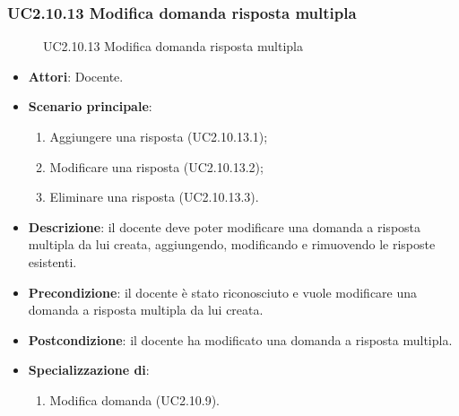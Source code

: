 \subsubsection{UC2.10.13 Modifica domanda risposta multipla}
\begin{figure}[H]
\centering
\noindent{}
\caption{UC2.10.13 Modifica domanda risposta multipla}
\end{figure}
\begin{itemize}
\item \textbf{Attori}: Docente.
\item \textbf{Scenario principale}:
\begin{enumerate}
\item Aggiungere una risposta (UC2.10.13.1);
\item Modificare una risposta (UC2.10.13.2);
\item Eliminare una risposta (UC2.10.13.3).
\end{enumerate}
\item \textbf{Descrizione}: il docente deve poter modificare una domanda a risposta multipla da lui creata, aggiungendo, modificando e rimuovendo le risposte esistenti.
\item \textbf{Precondizione}: il docente è stato riconosciuto e vuole modificare una domanda a risposta multipla da lui creata.
\item \textbf{Postcondizione}: il docente ha modificato una domanda a risposta multipla.
\item \textbf{Specializzazione di}:
\begin{enumerate}
\item Modifica domanda (UC2.10.9).
\end{enumerate}
\end{itemize}
